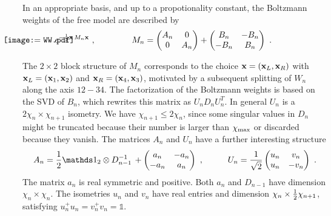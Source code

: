 \documentclass[a4paper,preprintnumbers,nofootinbib,twocolumn]{quantumarticle}
\newcommand{\be}{\begin{equation}} \newcommand{\ee}{\end{equation}}
\newcommand{\id}{\mathds 1}
\begin{document}
In an appropriate basis, and up to a propotionality constant, 
the Boltzmann weights of the free model are described by
\vspace*{-3.5cm}
\be
 \vcenter{\hbox{\hspace{-32mm} \texttt{[image: WW.pdf]}}} \hspace{-1.9cm} = \;\;\;\;\; e^{-{1 \over 2} {\bf x} \, M_n{\bf x}} \ , \hspace{1.5cm} M_n=\begin{pmatrix} A_n & 0 \\
                              0 & A_n \end{pmatrix} +  \begin{pmatrix} B_n  & -B_n \\
                                     -B_n & B_n \end{pmatrix} \ .                               
\label{Mfree2}                                  
\ee  
\vspace*{-3.7cm}

\noindent The $2 \times 2$ block structure of $M_n$ corresponds to the choice ${\bf x}=({\bf x}_L,{\bf x}_R)$ with ${\bf x}_L=({\bf x}_1,{\bf x}_2)$ and ${\bf x}_R=({\bf x}_4,{\bf x}_3)$, motivated by
a subsequent splitting of $W_n$ along the axis $12-34$. The factorization of the Boltzmann weights is based on the SVD of $B_n$, which rewrites this matrix as $U_n D_n U_n^T$. In general $U_n$ is a $2\chi_n \times \chi_{n+1}$ isometry. We have $\chi_{n+1} \leq 2\chi_n$, since some singular values in $D_n$ might be truncated because their number is larger than $\chi_{\rm max}$ or discarded because they vanish. 
The matrices $A_n$ and $U_n$ have a further interesting structure \cite{CS19}
\be
A_n = {1 \over 2} \id_2 \otimes  D_{n-1}^{-1}\, +  \begin{pmatrix}a_n  & -a_n \\
                                    -a_n & a_n \end{pmatrix} \ , \hspace{1cm} 
U_n={1 \over \sqrt{2}} \begin{pmatrix} u_n & v_n \\
                              u_n & -v_n \end{pmatrix}        \ .                           
\ee
The matrix $a_n$ is real symmetric and positive. Both $a_n$ and $D_{n-1}$ have dimension $\chi_n \! \times \! \chi_n$. The isometries $u_n$ and $v_n$ have real entries and dimension $\chi_n \times {1 \over 2}\chi_{n+1}$, satisfying $u_n^+ u_n= v_n^+ v_n = \id$.
\end{document}
